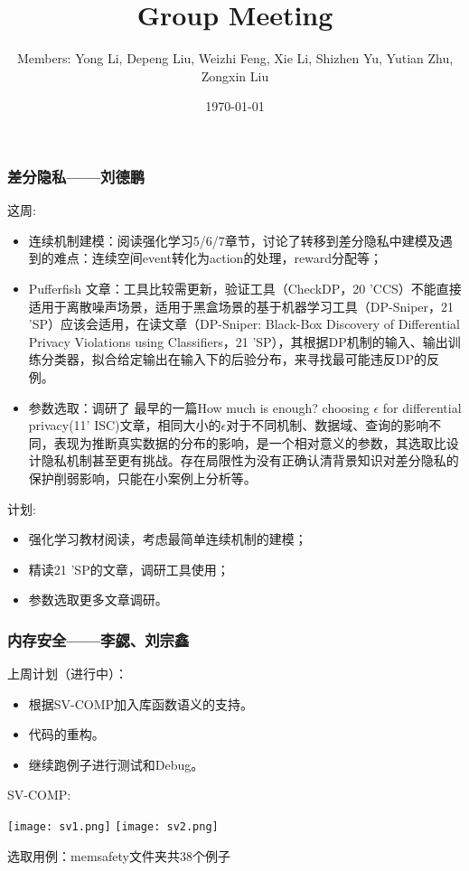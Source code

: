 \documentclass[aspectratio=1610, 13pt]{beamer}
\title{Group Meeting}
\date{\today}
\author{Members: Yong Li, Depeng Liu, Weizhi Feng, Xie Li, Shizhen Yu, Yutian Zhu, Zongxin Liu}
\begin{document}
\maketitle

\begin{frame}\frametitle{差分隐私——刘德鹏}
这周:
\begin{itemize}
  \item 连续机制建模：阅读强化学习5/6/7章节，讨论了转移到差分隐私中建模及遇到的难点：连续空间event转化为action的处理，reward分配等；
  \item Pufferfish 文章：工具比较需更新，验证工具（CheckDP，20 'CCS）不能直接适用于离散噪声场景，适用于黑盒场景的基于机器学习工具（DP-Sniper，21 'SP）应该会适用，在读文章（DP-Sniper: Black-Box Discovery of Differential Privacy Violations using Classifiers，21 'SP），其根据DP机制的输入、输出训练分类器，拟合给定输出在输入下的后验分布，来寻找最可能违反DP的反例。
  \item 参数选取：调研了 最早的一篇How much is enough? choosing $\epsilon$ for differential privacy(11’ ISC)文章，相同大小的$\epsilon$对于不同机制、数据域、查询的影响不同，表现为推断真实数据的分布的影响，是一个相对意义的参数，其选取比设计隐私机制甚至更有挑战。存在局限性为没有正确认清背景知识对差分隐私的保护削弱影响，只能在小案例上分析等。
\end{itemize}

计划:
\begin{itemize}
  \item 强化学习教材阅读，考虑最简单连续机制的建模；
  \item 精读21 'SP的文章，调研工具使用；
  \item 参数选取更多文章调研。
\end{itemize}
\end{frame}
\begin{frame}\frametitle{内存安全——李勰、刘宗鑫}
上周计划（进行中）：
\begin{itemize}
\item 根据SV-COMP加入库函数语义的支持。
\item 代码的重构。
\item 继续跑例子进行测试和Debug。
\end{itemize}

SV-COMP:
\begin{center}
\texttt{[image: sv1.png]}
\texttt{[image: sv2.png]}
\end{center}
选取用例：memsafety文件夹共38个例子



\end{frame}
\end{document}
